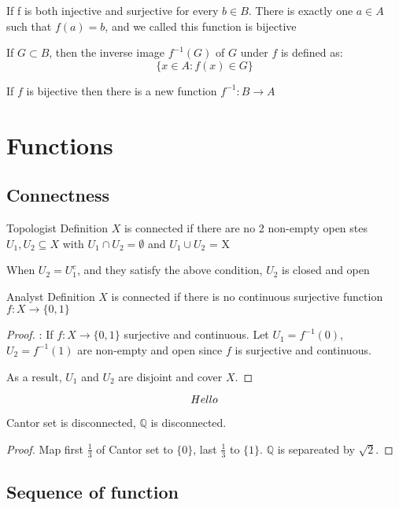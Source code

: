 \documentclass[11pt]{elegantbook}
\begin{document}
\begin{note}
    If f is both injective and surjective for every $b \in B $. There is exactly one $a \in A$ such that $f(a)= b$, and we called this function is bijective
\end{note}

\begin{definition}
    If $G \subset B$, then the inverse image $f^{-1}(G)$ of $G$ under $f$ is defined as:
    $$\{x \in A : f(x)\in G\}$$
\end{definition}

If $f$ is bijective then there is a new function $f^{-1}: B \rightarrow A$ 

\chapter{Functions}

\section{Connectness}

\begin{definition}{Topologist Definition}
    $X$ is connected if there are no 2 non-empty open stes $U_1, U_2\subseteq X$ with $ U_1 \cap U_2 = \emptyset$ and  $ U_1 \cup U_2$ = X
\end{definition}

\begin{note}
When $U_2 = U_1^c$, and they satisfy the above condition, $U_2$ is closed and open 
\end{note}

\begin{definition}{Analyst Definition}
    $X$ is connected if there is no continuous surjective function $f: X \rightarrow \{0, 1\}$ 
\end{definition}

\begin{proof}{:}
    If $f: X \rightarrow \{0, 1\}$ surjective and continuous. Let $U_1 = f^{-1}(0)$, $U_2 = f^{-1}(1)$ are non-empty and open since $f$ is surjective and continuous.

    As a result, $U_1$ and $U_2$ are disjoint and cover $X$.
\end{proof}

\begin{equation}
    $$Hello$$
\end{equation}

\begin{corollary}
    Cantor set is disconnected, $\mathbb{Q}$ is disconnected.
\end{corollary}
\begin{proof}
    Map first $\frac{1}{3}$ of Cantor set to $\{0\}$, last $\frac{1}{3}$ to $\{1\}$. $\mathbb{Q}$ is separeated by $\sqrt{2}$.
\end{proof}
\section{Sequence of function}
\end{document}
